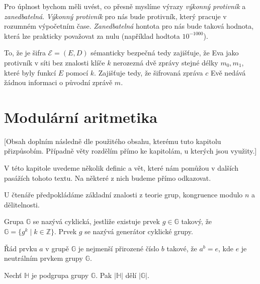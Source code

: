 \documentclass[
  program=infoi,
  biblatex,
  figures=false,
  glossaries,
  index
]{kidiplom}
\begin{document}
        Pro úplnost bychom měli uvést, co přesně myslíme výrazy \emph{výkonný protivník} a \emph{zanedbatelná}.
        \emph{Výkonný protivník} pro nás bude protivník, který pracuje v rozumném výpočetním čase.
        \emph{Zanedbatelná} hontota pro nás bude taková hodnota, která lze prakticky považovat za nulu (například hodtota $10^{-1000}$).


        To, že je šifra $\mathcal{E}  = (E, D)$ sémanticky bezpečná tedy zajišťuje, že Eva jako protivník v síti
        bez znalosti klíče $k$ nerozezná dvě zprávy stejné délky $m_0, m_1$, které byly funkcí $E$ pomocí $k$.
        Zajišťuje tedy, že šifrovaná zpráva $c$ Evě nedává žádnou informaci o původní zprávě $m$.


\section{Modulární aritmetika}\label{sec:modular-arithmetic}

    [Obsah doplním následně dle použitého obsahu, kterému tuto kapitolu přizpůsobím.
    Případně věty rozdělím přímo ke kapitolám, u kterých jsou využity.]

    V této kapitole uvedeme několik definic a vět, které nám pomůžou v dalších pasážích tohoto textu.
    Na některé z nich budeme přímo odkazovat.
    
    U čtenáře předpokládáme základní znalosti z teorie grup, kongruence modulo $n$ a dělitelnosti.



    \begin{definition}
        Grupa $\mathbb{G}$ se nazývá cyklická, jestliže existuje prvek $g \in \mathbb{G}$ takový, že $\mathbb{G} =\{g^k \mid k \in \mathbb{Z}\}$.
        Prvek $g$ se nazývá generátor cyklické grupy.
    \end{definition}

    \begin{definition}
        Řád prvku $a$ v grupě $\mathbb{G}$ je nejmenší přirozené číslo $b$ takové, že $a^b = e$, kde $e$ je neutrálním prvkem grupy $\mathbb{G}$.
    \end{definition}


    \begin{theorem}
        
        Nechť $\mathbb{H}$ je podgrupa grupy $\mathbb{G}$. Pak $|\mathbb{H}|$ dělí $|\mathbb{G}|$.
    \end{theorem}
\end{document}
